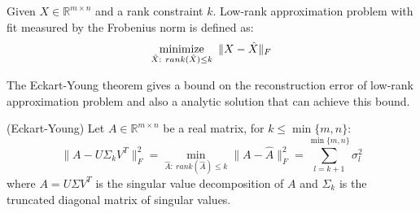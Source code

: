 \documentclass[../book-template.tex]{subfiles}
\begin{document}
\begin{definition}
Given $X\in \mathbb{R}^{m\times n}$ and a rank constraint $k$. Low-rank approximation problem with fit measured by the Frobenius norm is defined as:
\begin{equation*}
    \mathop{{\rm minimize}}_{\hat{X}:\ rank(\hat{X})\leq k}\ \|X-\hat{X}\|_F
\end{equation*}
\end{definition}
\par The Eckart-Young theorem gives a bound on the reconstruction error of low-rank approximation problem and also a analytic solution that can achieve this bound.
\begin{theorem}\label{thm_1_EY}
(Eckart-Young) Let $A\in \mathbb{R}^{m\times n}$ be a real matrix, for $k\leq \min\{m,n\}$:
\begin{equation*}
    \|A-U\Sigma_kV^T\|_F^2 = \min_{\hat{A}:\ rank(\hat{A})\leq k}\|A-\hat{A}\|^2_F = \sum_{l=k+1}^{\min\{m,n\}}\sigma_l^2 
\end{equation*}
where $A=U\Sigma V^T$ is the singular value decomposition of $A$ and $\Sigma_k$ is the truncated diagonal matrix of singular values.
\end{theorem}
\end{document}
